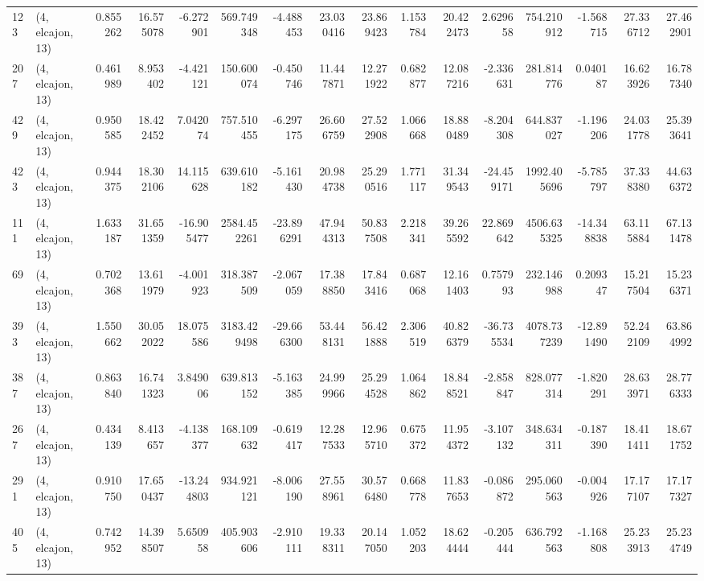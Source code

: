 \begin{tabular}{llrrrrrrrrrrrrrr}
123 &  (4, elcajon, 13) &   0.855262 &  16.575078 &  -6.272901 &   569.749348 &  -4.488453 &  23.030416 &  23.869423 &  1.153784 &  20.422473 &   2.629658 &    754.210912 &   -1.568715 &   27.336712 &   27.462901 \\
207 &  (4, elcajon, 13) &   0.461989 &   8.953402 &  -4.421121 &   150.600074 &  -0.450746 &  11.447871 &  12.271922 &  0.682877 &  12.087216 &  -2.336631 &    281.814776 &    0.040187 &   16.623926 &   16.787340 \\
429 &  (4, elcajon, 13) &   0.950585 &  18.422452 &   7.042074 &   757.510455 &  -6.297175 &  26.606759 &  27.522908 &  1.066668 &  18.880489 &  -8.204308 &    644.837027 &   -1.196206 &   24.031778 &   25.393641 \\
423 &  (4, elcajon, 13) &   0.944375 &  18.302106 &  14.115628 &   639.610182 &  -5.161430 &  20.984738 &  25.290516 &  1.771117 &  31.349543 & -24.459171 &   1992.405696 &   -5.785797 &   37.338380 &   44.636372 \\
111 &  (4, elcajon, 13) &   1.633187 &  31.651359 & -16.905477 &  2584.452261 & -23.896291 &  47.944313 &  50.837508 &  2.218341 &  39.265592 &  22.869642 &   4506.635325 &  -14.348838 &   63.115884 &   67.131478 \\
69  &  (4, elcajon, 13) &   0.702368 &  13.611979 &  -4.001923 &   318.387509 &  -2.067059 &  17.388850 &  17.843416 &  0.687068 &  12.161403 &   0.757993 &    232.146988 &    0.209347 &   15.217504 &   15.236371 \\
393 &  (4, elcajon, 13) &   1.550662 &  30.052022 &  18.075586 &  3183.429498 & -29.666300 &  53.448131 &  56.421888 &  2.306519 &  40.826379 & -36.735534 &   4078.737239 &  -12.891490 &   52.242109 &   63.864992 \\
387 &  (4, elcajon, 13) &   0.863840 &  16.741323 &   3.849006 &   639.813152 &  -5.163385 &  24.999966 &  25.294528 &  1.064862 &  18.848521 &  -2.858847 &    828.077314 &   -1.820291 &   28.633971 &   28.776333 \\
267 &  (4, elcajon, 13) &   0.434139 &   8.413657 &  -4.138377 &   168.109632 &  -0.619417 &  12.287533 &  12.965710 &  0.675372 &  11.954372 &  -3.107132 &    348.634311 &   -0.187390 &   18.411411 &   18.671752 \\
291 &  (4, elcajon, 13) &   0.910750 &  17.650437 & -13.244803 &   934.921121 &  -8.006190 &  27.558961 &  30.576480 &  0.668778 &  11.837653 &  -0.086872 &    295.060563 &   -0.004926 &   17.177107 &   17.177327 \\
405 &  (4, elcajon, 13) &   0.742952 &  14.398507 &   5.650958 &   405.903606 &  -2.910111 &  19.338311 &  20.147050 &  1.052203 &  18.624444 &  -0.205444 &    636.792563 &   -1.168808 &   25.233913 &   25.234749 \\

\end{tabular}
